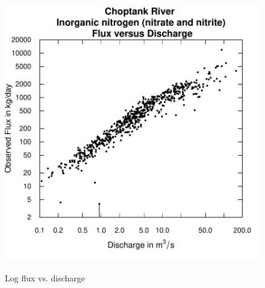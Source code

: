 \documentclass[a4paper,11pt]{article}
\begin{document}
\begin{figure}[htbp]
  \begin{minipage}[h]{0.5\linewidth}
    \begin{center}

\includegraphics{EGRET-figplotLogFluxQ}
    \label{fig:plotLogFluxQ}
    \end{center}
  \end{minipage}
  \caption{Log flux vs. discharge}
  \label{fig:plotLogFluxQMain}
\end{figure}
\end{document}
